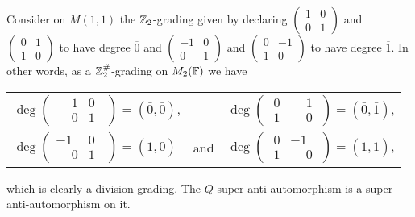 \begin{ex}\label{ex:supertransp-graded-new}
	Consider on $M(1,1)$ the $\mathbb{Z}_2$-grading given by declaring
	$\begin{pmatrix}
			1 & 0 \\
			0 & 1
		\end{pmatrix}$ and
	$\begin{pmatrix}
			0 & 1 \\
			1 & 0
		\end{pmatrix}$ to have degree $\overline 0$ and
	$\begin{pmatrix}
			-1 & 0 \\
			0  & 1
		\end{pmatrix}$ and
	$\begin{pmatrix}
			0 & -1 \\
			1 & 0
		\end{pmatrix}$ to have degree $\overline 1$. In other words, as a $\mathbb{Z}_2^\#$-grading on $M_2(\mathbb{F})$ we have\\
	\begin{center}
		\begin{tabular}{ l c r }
			$\deg \begin{pmatrix}
					\phantom{-}1 & 0\phantom{..} \\
					\phantom{-}0 & 1\phantom{..}
				\end{pmatrix} = (\bar 0, \bar 0)$, &                                                       & $\deg \begin{pmatrix}
					\phantom{.}0 & \phantom{-}1\phantom{.} \\
					\phantom{.}1 & \phantom{-}0\phantom{.}
				\end{pmatrix} = (\bar 0, \bar 1)$, \\
			$\deg \begin{pmatrix}
					-1           & 0\phantom{..} \\
					\phantom{-}0 & 1\phantom{..}
				\end{pmatrix} = (\bar 1, \bar 0)$  &
			and
			                                                      & $\deg \begin{pmatrix}
					\phantom{.}0 & -1\phantom{.}           \\
					\phantom{.}1 & \phantom{-}0\phantom{.}
				\end{pmatrix} = (\bar 1, \bar 1)$,
		\end{tabular}
	\end{center}
	which is clearly a division grading.
	The $Q$-super-anti-automorphism is a super-anti-automorphism on it.
\end{ex}

